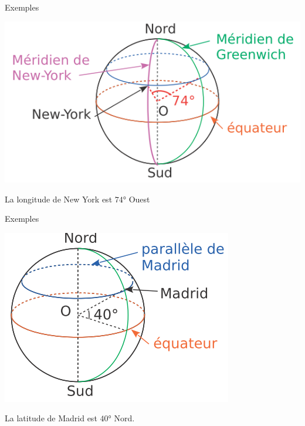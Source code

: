 \documentclass[xcolor={dvipsnames}]{beamer}
\begin{document}
\begin{frame}
	\begin{exampleblock}{Exemples}
		
		\begin{center}
			\includegraphics[scale=0.6]{../img/terre1}
		\end{center}
				
		La longitude de New York est \pause $74$° Ouest

	\end{exampleblock}
\end{frame}			


\begin{frame}
	\begin{exampleblock}{Exemples}
		
		\begin{center}
			\includegraphics[scale=0.6]{../img/terre2}
		\end{center}
		
		La latitude de Madrid est \pause $40$° Nord.
		
	\end{exampleblock}
\end{frame}			
\end{document}
